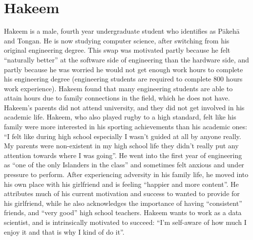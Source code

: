 \section*{Hakeem}
Hakeem is a male, fourth year undergraduate student who identifies as P\={a}keh\={a} and Tongan. He is now studying computer science, after switching from his original engineering degree. This swap was motivated partly because he felt ``naturally better'' at the software side of engineering than the hardware side, and partly because he was worried he would not get enough work hours to complete his engineering degree (engineering students are required to complete 800 hours work experience). Hakeem found that many engineering students are able to attain hours due to family connections in the field, which he does not have. Hakeem's parents did not attend university, and they did not get involved in his academic life. Hakeem, who also played rugby to a high standard, felt like his family were more interested in his sporting achievements than his academic ones: ``I felt like during high school especially I wasn't guided at all by anyone really. My parents were non-existent in my high school life they didn't really put any attention towards where I was going''. He went into the first year of engineering as ``one of the only Islanders in the class'' and sometimes felt anxious and under pressure to perform. After experiencing adversity in his family life, he moved into his own place with his girlfriend and is feeling ``happier and more content''. He attributes much of his current motivation and success to wanted to provide for his girlfriend, while he also acknowledges the importance of having ``consistent'' friends, and ``very good'' high school teachers. Hakeem wants to work as a data scientist, and is intrinsically motivated to succeed: ``I'm self-aware of how much I enjoy it and that is why I kind of do it''.  

